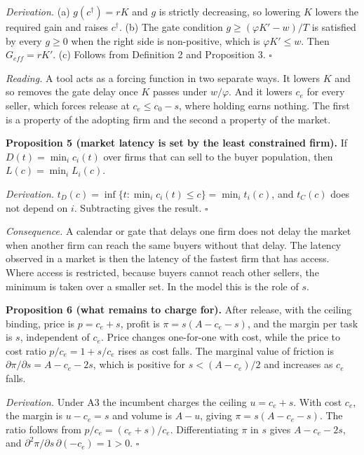 \documentclass[10pt,letterpaper]{article}
\begin{document}
\emph{Derivation.} (a) \(g(c^\dagger) = rK\) and \(g\) is strictly
decreasing, so lowering \(K\) lowers the required gain and raises
\(c^\dagger\). (b) The gate condition \(g \ge (\varphi K' - w)/T\) is
satisfied by every \(g \ge 0\) when the right side is non-positive,
which is \(\varphi K' \le w\). Then \(G_{eff} = rK'\). (c) Follows from
Definition 2 and Proposition 3. \(\square\)

\emph{Reading.} A tool acts as a forcing function in two separate ways.
It lowers \(K\) and so removes the gate delay once \(K\) passes under
\(w/\varphi\). And it lowers \(c_e\) for every seller, which forces
release at \(c_e \le c_0 - s\), where holding earns nothing. The first
is a property of the adopting firm and the second a property of the
market.

\textbf{Proposition 5 (market latency is set by the least constrained
firm).} If \(D(t) = \min_i c_i(t)\) over firms that can sell to the
buyer population, then \(L(c) = \min_i L_i(c)\).

\emph{Derivation.}
\(t_D(c) = \inf\{t : \min_i c_i(t) \le c\} = \min_i t_i(c)\), and
\(t_C(c)\) does not depend on \(i\). Subtracting gives the result.
\(\square\)

\emph{Consequence.} A calendar or gate that delays one firm does not
delay the market when another firm can reach the same buyers without
that delay. The latency observed in a market is then the latency of the
fastest firm that has access. Where access is restricted, because buyers
cannot reach other sellers, the minimum is taken over a smaller set. In
the model this is the role of \(s\).

\textbf{Proposition 6 (what remains to charge for).} After release, with
the ceiling binding, price is \(p = c_e + s\), profit is
\(\pi = s(A - c_e - s)\), and the margin per task is \(s\), independent
of \(c_e\). Price changes one-for-one with cost, while the price to cost
ratio \(p/c_e = 1 + s/c_e\) rises as cost falls. The marginal value of
friction is \(\partial \pi / \partial s = A - c_e - 2s\), which is
positive for \(s < (A - c_e)/2\) and increases as \(c_e\) falls.

\emph{Derivation.} Under A3 the incumbent charges the ceiling
\(u = c_e + s\). With cost \(c_e\), the margin is \(u - c_e = s\) and
volume is \(A - u\), giving \(\pi = s(A - c_e - s)\). The ratio follows
from \(p/c_e = (c_e + s)/c_e\). Differentiating \(\pi\) in \(s\) gives
\(A - c_e - 2s\), and
\(\partial^2\pi / \partial s\,\partial(-c_e) = 1 > 0\). \(\square\)
\end{document}
